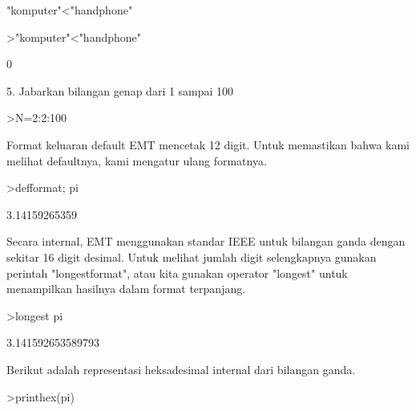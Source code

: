 \documentclass[a4paper,10pt]{article}
\begin{document}
\begin{eulernotebook}
\begin{eulercomment}
\begin{eulercomment}
\begin{eulercomment}
\begin{eulercomment}
\begin{eulercomment}
"komputer"\textless{}"handphone"
\end{eulercomment}
\begin{eulerprompt}
>"komputer"<"handphone"
\end{eulerprompt}
\begin{euleroutput}
  0
\end{euleroutput}
\begin{eulercomment}
5. Jabarkan bilangan genap dari 1 sampai 100
\end{eulercomment}
\begin{eulerprompt}
>N=2:2:100
\end{eulerprompt}
\begin{euleroutput}
  [2,  4,  6,  8,  10,  12,  14,  16,  18,  20,  22,  24,  26,  28,  30,
  32,  34,  36,  38,  40,  42,  44,  46,  48,  50,  52,  54,  56,  58,
  60,  62,  64,  66,  68,  70,  72,  74,  76,  78,  80,  82,  84,  86,
  88,  90,  92,  94,  96,  98,  100]
\end{euleroutput}
\begin{eulercomment}
Format keluaran default EMT mencetak 12 digit. Untuk memastikan bahwa
kami melihat defaultnya, kami mengatur ulang formatnya.
\end{eulercomment}
\begin{eulerprompt}
>defformat; pi
\end{eulerprompt}
\begin{euleroutput}
  3.14159265359
\end{euleroutput}
\begin{eulercomment}
Secara internal, EMT menggunakan standar IEEE untuk bilangan ganda
dengan sekitar 16 digit desimal. Untuk melihat jumlah digit
selengkapnya gunakan perintah "longestformat", atau kita gunakan
operator "longest" untuk menampilkan hasilnya dalam format terpanjang.
\end{eulercomment}
\begin{eulerprompt}
>longest pi
\end{eulerprompt}
\begin{euleroutput}
        3.141592653589793 
\end{euleroutput}
\begin{eulercomment}
Berikut adalah representasi heksadesimal internal dari bilangan ganda.
\end{eulercomment}
\begin{eulerprompt}
>printhex(pi)
\end{eulerprompt}
\begin{euleroutput}

\end{euleroutput}
\end{eulercomment}
\end{eulercomment}
\end{eulercomment}
\end{eulercomment}
\end{eulernotebook}
\end{document}
